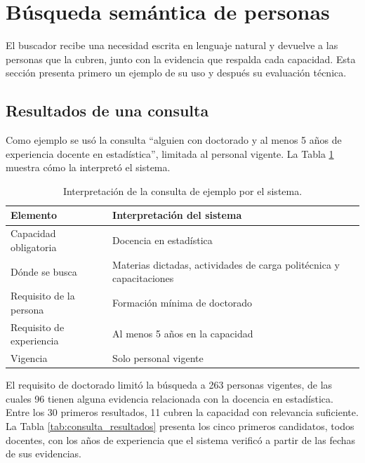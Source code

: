 \section{Búsqueda semántica de personas}
\label{sec:res_busqueda}

El buscador recibe una necesidad escrita en lenguaje natural y devuelve a las personas que la cubren, junto con la evidencia que respalda cada capacidad. Esta sección presenta primero un ejemplo de su uso y después su evaluación técnica.

\subsection{Resultados de una consulta}
\label{sec:res_busqueda_ejemplo}

Como ejemplo se usó la consulta ``alguien con doctorado y al menos 5 años de experiencia docente en estadística'', limitada al personal vigente. La Tabla \ref{tab:consulta_interpretacion} muestra cómo la interpretó el sistema.

\begin{table}[!htbp]
    \centering
    \caption{Interpretación de la consulta de ejemplo por el sistema.}
    \label{tab:consulta_interpretacion}
    \small
    \begin{tabular}{>{\raggedright\arraybackslash}p{4.4cm} >{\raggedright\arraybackslash}p{9.6cm}}
        \toprule
        \textbf{Elemento} & \textbf{Interpretación del sistema} \\
        \midrule
        Capacidad obligatoria & Docencia en estadística \\
        Dónde se busca & Materias dictadas, actividades de carga politécnica y capacitaciones \\
        Requisito de la persona & Formación mínima de doctorado \\
        Requisito de experiencia & Al menos 5 años en la capacidad \\
        Vigencia & Solo personal vigente \\
        \bottomrule
    \end{tabular}
\end{table}

El requisito de doctorado limitó la búsqueda a 263 personas vigentes, de las cuales 96 tienen alguna evidencia relacionada con la docencia en estadística. Entre los 30 primeros resultados, 11 cubren la capacidad con relevancia suficiente. La Tabla \ref{tab:consulta_resultados} presenta los cinco primeros candidatos, todos docentes, con los años de experiencia que el sistema verificó a partir de las fechas de sus evidencias.

